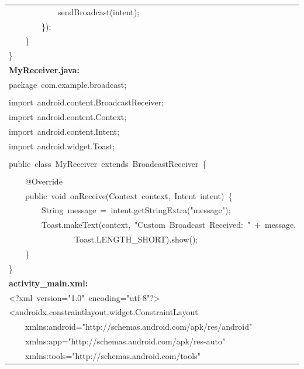 \documentclass[a4paper,12pt]{article}
\begin{document}
\begin{longtable}{|p{}|}
{\ttfamily\small \ \ \ \ \ \ \ \ \ \ \ \ sendBroadcast(intent);} \\
{\ttfamily\small \ \ \ \ \ \ \ \ \});} \\
{\ttfamily\small \ \ \ \ \}} \\
{\ttfamily\small \}} \\
\hline
\rule{0pt}{13pt}\textbf{MyReceiver.java:} \\
\hline
{\ttfamily\small package\ com.example.broadcast;} \\
\strut \\
{\ttfamily\small import\ android.content.BroadcastReceiver;} \\
{\ttfamily\small import\ android.content.Context;} \\
{\ttfamily\small import\ android.content.Intent;} \\
{\ttfamily\small import\ android.widget.Toast;} \\
\strut \\
{\ttfamily\small public\ class\ MyReceiver\ extends\ BroadcastReceiver\ \{} \\
\strut \\
{\ttfamily\small \ \ \ \ @Override} \\
{\ttfamily\small \ \ \ \ public\ void\ onReceive(Context\ context,\ Intent\ intent)\ \{} \\
{\ttfamily\small \ \ \ \ \ \ \ \ String\ message\ =\ intent.getStringExtra("message");} \\
{\ttfamily\small \ \ \ \ \ \ \ \ Toast.makeText(context,\ "Custom\ Broadcast\ Received:\ "\ +\ message,} \\
{\ttfamily\small \ \ \ \ \ \ \ \ \ \ \ \ \ \ \ \ Toast.LENGTH\_SHORT).show();} \\
{\ttfamily\small \ \ \ \ \}} \\
{\ttfamily\small \}} \\
\hline
\rule{0pt}{13pt}\textbf{activity\_main.xml:} \\
\hline
{\ttfamily\small \textless{}?xml\ version="1.0"\ encoding="utf-8"?\textgreater{}} \\
{\ttfamily\small \textless{}androidx.constraintlayout.widget.ConstraintLayout} \\
{\ttfamily\small \ \ \ \ xmlns:android="http://schemas.android.com/apk/res/android"} \\
{\ttfamily\small \ \ \ \ xmlns:app="http://schemas.android.com/apk/res-auto"} \\
{\ttfamily\small \ \ \ \ xmlns:tools="http://schemas.android.com/tools"} \\

\end{longtable}
\end{document}
